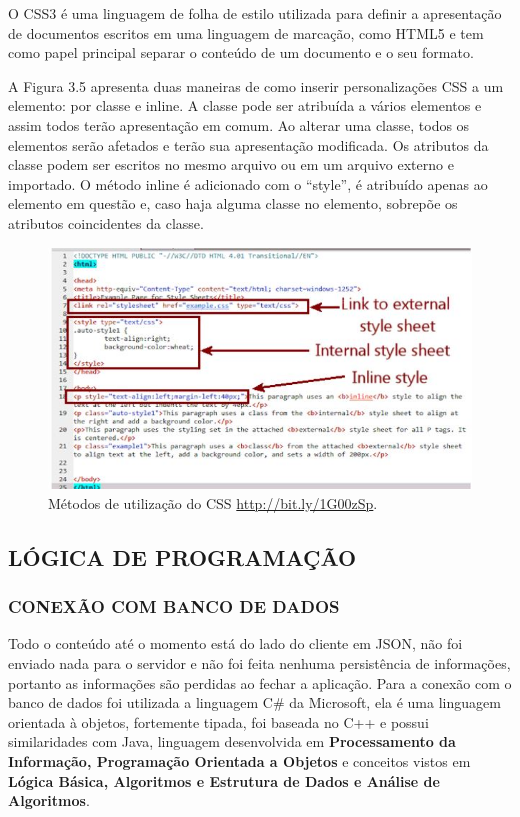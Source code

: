 \documentclass[
  12pt,				%
  openany,
  oneside,
  a4paper,			%
  english,			%
  brazil
]{article}
\numberwithin{figure}{section}
\numberwithin{table}{section}
\begin{document}
O CSS3 é uma linguagem de folha de estilo utilizada para definir a apresentação de documentos escritos em uma linguagem de marcação, como HTML5 e tem como papel principal separar o conteúdo de um documento e o seu formato.

A Figura 3.5 apresenta duas maneiras de como inserir personalizações CSS a um elemento: por classe e inline. A classe pode ser atribuída a vários elementos e assim todos terão apresentação em comum. Ao alterar uma classe, todos os elementos serão afetados e terão sua apresentação modificada. Os atributos da classe podem ser escritos no mesmo arquivo ou em um arquivo externo e importado. O método inline é adicionado com o “style”, é atribuído apenas ao elemento em questão e, caso haja alguma classe no elemento, sobrepõe os atributos coincidentes da classe.

\begin{figure}[!htb]
\centering
\includegraphics[width=1\textwidth]{figura35}
\caption{Métodos de utilização do CSS \url{http://bit.ly/1G00zSp}.}
\end{figure}


\subsection{LÓGICA DE PROGRAMAÇÃO}
\subsubsection{CONEXÃO COM BANCO DE DADOS}

Todo o conteúdo até o momento está do lado do cliente em JSON, não foi enviado nada para o servidor e não foi feita nenhuma persistência de informações, portanto as informações são perdidas ao fechar a aplicação. Para a conexão com o banco de dados foi utilizada a linguagem C\# da Microsoft, ela é uma linguagem orientada à objetos, fortemente tipada, foi baseada no C++ e possui similaridades com Java, linguagem desenvolvida em \textbf{Processamento da Informação, Programação Orientada a Objetos} e conceitos vistos em \textbf{Lógica Básica, Algoritmos e Estrutura de Dados e Análise de Algoritmos}.
\end{document}
